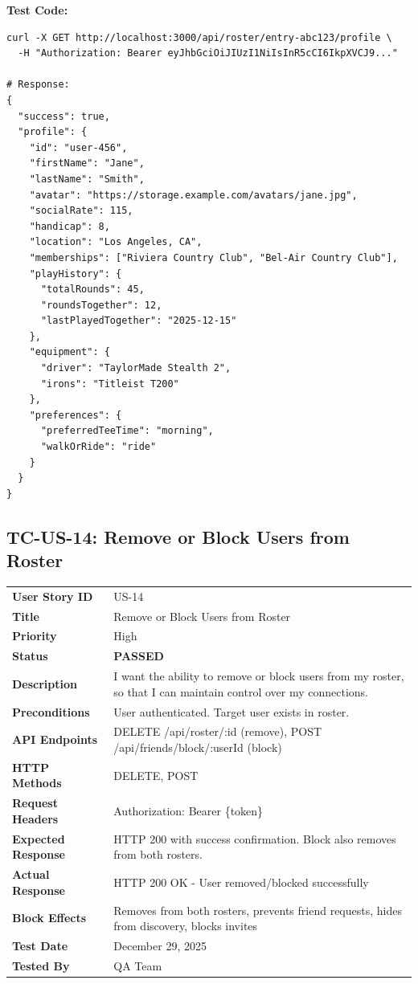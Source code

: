 \documentclass[11pt,a4paper]{article}
\newcommand{\passed}{\textcolor{pass}{\textbf{PASSED}}}
\begin{document}
\vspace{0.3cm}
\textbf{Test Code:}
\begin{lstlisting}
curl -X GET http://localhost:3000/api/roster/entry-abc123/profile \
  -H "Authorization: Bearer eyJhbGciOiJIUzI1NiIsInR5cCI6IkpXVCJ9..."

# Response:
{
  "success": true,
  "profile": {
    "id": "user-456",
    "firstName": "Jane",
    "lastName": "Smith",
    "avatar": "https://storage.example.com/avatars/jane.jpg",
    "socialRate": 115,
    "handicap": 8,
    "location": "Los Angeles, CA",
    "memberships": ["Riviera Country Club", "Bel-Air Country Club"],
    "playHistory": {
      "totalRounds": 45,
      "roundsTogether": 12,
      "lastPlayedTogether": "2025-12-15"
    },
    "equipment": {
      "driver": "TaylorMade Stealth 2",
      "irons": "Titleist T200"
    },
    "preferences": {
      "preferredTeeTime": "morning",
      "walkOrRide": "ride"
    }
  }
}
\end{lstlisting}

\vspace{0.5cm}


\subsection{TC-US-14: Remove or Block Users from Roster}

\begin{tabularx}{\textwidth}{|p{3.2cm}|Y|}
\hline
{}
 \\
\hline
\textbf{User Story ID} & US-14 \\
\hline
\textbf{Title} & Remove or Block Users from Roster \\
\hline
\textbf{Priority} & High \\
\hline
\textbf{Status} & \passed \\
\hline
\textbf{Description} & I want the ability to remove or block users from my roster, so that I can maintain control over my connections. \\
\hline
\textbf{Preconditions} & User authenticated. Target user exists in roster. \\
\hline
\textbf{API Endpoints} & DELETE /api/roster/:id (remove), POST /api/friends/block/:userId (block) \\
\hline
\textbf{HTTP Methods} & DELETE, POST \\
\hline
\textbf{Request Headers} & Authorization: Bearer \{token\} \\
\hline
\textbf{Expected Response} & HTTP 200 with success confirmation. Block also removes from both rosters. \\
\hline
\textbf{Actual Response} & HTTP 200 OK - User removed/blocked successfully \\
\hline
\textbf{Block Effects} & Removes from both rosters, prevents friend requests, hides from discovery, blocks invites \\
\hline
\textbf{Test Date} & December 29, 2025 \\
\hline
\textbf{Tested By} & QA Team \\
\hline
\end{tabularx}
\end{document}
